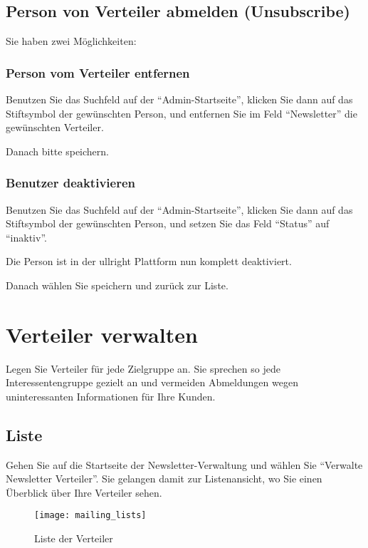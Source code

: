 \documentclass[article, a4paper, oneside, 11pt]{memoir}
\begin{document}
\section{Person von Verteiler abmelden (Unsubscribe)}

Sie haben zwei Möglichkeiten:

\subsection{Person vom Verteiler entfernen}

Benutzen Sie das Suchfeld auf der "`Admin-Startseite"', klicken Sie dann auf das Stiftsymbol der gewünschten Person, und entfernen Sie im Feld "`Newsletter"' die gewünschten Verteiler.

Danach bitte speichern.

\subsection{Benutzer deaktivieren}

Benutzen Sie das Suchfeld auf der "`Admin-Startseite"', klicken Sie dann auf das Stiftsymbol der gewünschten Person, und setzen Sie das Feld "`Status"' auf "`inaktiv"'.

Die Person ist in der ullright Plattform nun komplett deaktiviert.

Danach wählen Sie speichern und zurück zur Liste.



\chapter{Verteiler verwalten}
\label{sec:verteiler}

Legen Sie Verteiler für jede Zielgruppe an. Sie sprechen so jede Interessentengruppe gezielt an und vermeiden Abmeldungen wegen uninteressanten Informationen für Ihre Kunden.

\section{Liste}

Gehen Sie auf die Startseite der Newsletter-Verwaltung und wählen Sie "`Verwalte Newsletter Verteiler"'. Sie gelangen damit zur Listenansicht, wo Sie einen Überblick über Ihre Verteiler sehen.

\begin{figure}[htp]
\centering
\texttt{[image: mailing\_lists]}
\caption{Liste der Verteiler}
\label{fig:mailing_lists}
\end{figure}
\end{document}
